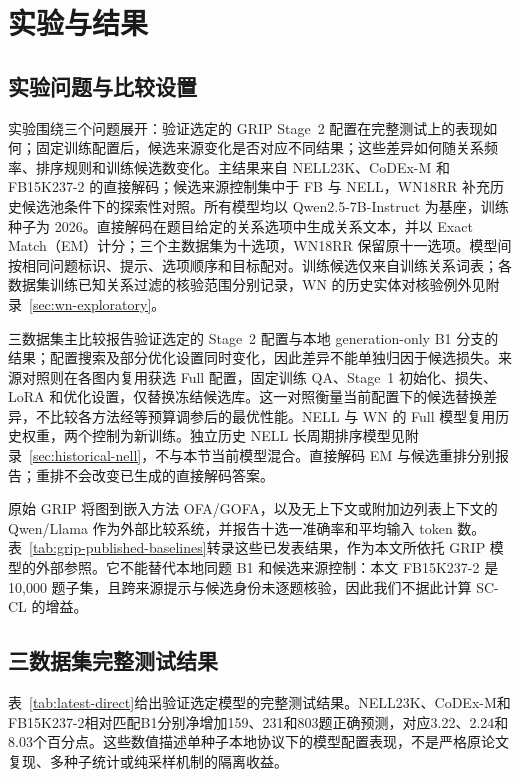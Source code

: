 \section{实验与结果}
\label{sec:experiments}

\subsection{实验问题与比较设置}

实验围绕三个问题展开：验证选定的 GRIP Stage~2 配置在完整测试上的表现如何；固定训练配置后，候选来源变化是否对应不同结果；这些差异如何随关系频率、排序规则和训练候选数变化。主结果来自 NELL23K、CoDEx-M 和 FB15K237-2 的直接解码；候选来源控制集中于 FB 与 NELL，WN18RR 补充历史候选池条件下的探索性对照。所有模型均以 Qwen2.5-7B-Instruct 为基座，训练种子为 2026。直接解码在题目给定的关系选项中生成关系文本，并以 Exact Match（EM）计分；三个主数据集为十选项，WN18RR 保留原十一选项。模型间按相同问题标识、提示、选项顺序和目标配对。训练候选仅来自训练关系词表；各数据集训练已知关系过滤的核验范围分别记录，WN 的历史实体对核验例外见附录~\ref{sec:wn-exploratory}。

三数据集主比较报告验证选定的 Stage~2 配置与本地 generation-only B1 分支的结果；配置搜索及部分优化设置同时变化，因此差异不能单独归因于候选损失。来源对照则在各图内复用获选 Full 配置，固定训练 QA、Stage~1 初始化、损失、LoRA 和优化设置，仅替换冻结候选库。这一对照衡量当前配置下的候选替换差异，不比较各方法经等预算调参后的最优性能。NELL 与 WN 的 Full 模型复用历史权重，两个控制为新训练。独立历史 NELL 长周期排序模型见附录~\ref{sec:historical-nell}，不与本节当前模型混合。直接解码 EM 与候选重排分别报告；重排不会改变已生成的直接解码答案。

原始 GRIP 将图到嵌入方法 OFA/GOFA，以及无上下文或附加边列表上下文的 Qwen/Llama 作为外部比较系统，并报告十选一准确率和平均输入 token 数。表~\ref{tab:grip-published-baselines}转录这些已发表结果，作为本文所依托 GRIP 模型的外部参照。它不能替代本地同题 B1 和候选来源控制：本文 FB15K237-2 是 10,000 题子集，且跨来源提示与候选身份未逐题核验，因此我们不据此计算 SC-CL 的增益。



\subsection{三数据集完整测试结果}

表~\ref{tab:latest-direct}给出验证选定模型的完整测试结果。NELL23K、CoDEx-M和FB15K237-2相对匹配B1分别净增加159、231和803题正确预测，对应3.22、2.24和8.03个百分点。这些数值描述单种子本地协议下的模型配置表现，不是严格原论文复现、多种子统计或纯采样机制的隔离收益。

